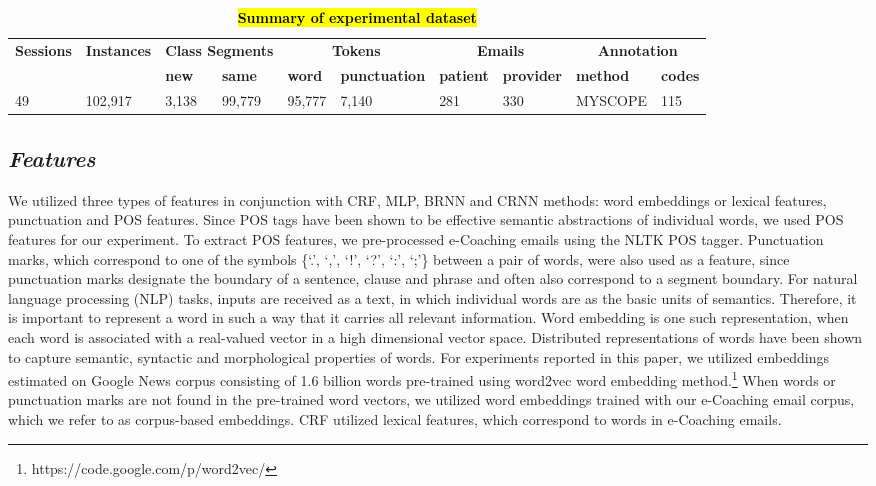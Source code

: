 \documentclass{amia}
\begin{document}
\begin{table}[ht]
\centering
\caption{\textbf{\hl{Summary of experimental dataset}}}
\label{tab:datastat}
 \begin{tabular}{|l|l|l|l|l|l|l|l|l|l|}
  \hline
   \multirow{2}{*}{\textbf{Sessions}} & \multirow{2}{*}{\textbf{Instances}} & \multicolumn{2}{|c|}{\textbf{Class Segments}} & \multicolumn{2}{|c|}{\textbf{Tokens}} & \multicolumn{2}{|c|}{\textbf{Emails}} & \multicolumn{2}{|c|}{\textbf{Annotation}} \\\cline{3-10}
   &  & \textbf{new}  & \textbf{same} & \textbf{word} & \textbf{punctuation}  & \textbf{patient} & \textbf{provider} & \textbf{method}  & \textbf{codes} \\ \hline    
 49 & 102,917 & 3,138 & 99,779 & 95,777 & 7,140 & 281 & 330 & MYSCOPE & 115 \\ \hline
  \end{tabular}
\end{table}     

\subsection*{\textit{Features}}
We utilized three types of features in conjunction with CRF, MLP, BRNN and CRNN methods: word embeddings or lexical features, punctuation and POS features. Since POS tags have been shown to be effective semantic abstractions of individual words, we used POS features for our experiment.\cite{liu2005using,treviso2017sentence} To extract POS features, we pre-processed e-Coaching emails using the NLTK POS tagger. Punctuation marks, which correspond to one of the symbols \{`.', `,', `!', `?', `:', `;'\} between a pair of words, were also used as a feature, since punctuation marks designate the boundary of a sentence, clause and phrase and often also correspond to a segment boundary.\cite{cho2002text} For natural language processing (NLP) tasks, inputs are received as a text, in which individual words are as the basic units of semantics. Therefore, it is important to represent a word in such a way that it carries all relevant information. Word embedding is one such representation, when each word is associated with a real-valued vector in a high dimensional vector space. Distributed representations of words have been shown to capture semantic, syntactic and morphological properties of words.\cite{pennington2014glove, mikolov2013distributed} For experiments reported in this paper, we utilized embeddings estimated on Google News corpus consisting of 1.6 billion words pre-trained using word2vec word embedding method.\footnote{\label{fn:word2vec}https://code.google.com/p/word2vec/} When words or punctuation marks are not found in the pre-trained word vectors, we utilized word embeddings trained with our e-Coaching email corpus, which we refer to as corpus-based embeddings. CRF utilized lexical features, which correspond to words in e-Coaching emails. 
\end{document}
